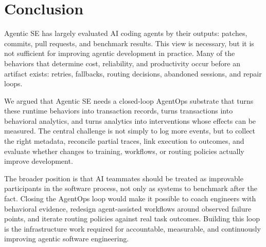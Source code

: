 \documentclass[sigconf,anonymous,review]{acmart}
\begin{document}
\section{Conclusion}
\label{sec:conclusion}


Agentic SE has largely evaluated AI coding agents by their outputs:
patches, commits, pull requests, and benchmark results. This view is
necessary, but it is not sufficient for improving agentic development
in practice. Many of the behaviors that determine cost, reliability,
and productivity occur before an artifact exists: retries, fallbacks,
routing decisions, abandoned sessions, and repair loops.

We argued that Agentic SE needs a closed-loop AgentOps substrate that
turns these runtime behaviors into transaction records, turns
transactions into behavioral analytics, and turns analytics into
interventions whose effects can be measured. The central challenge is
not simply to log more events, but to collect the right metadata,
reconcile partial traces, link execution to outcomes, and evaluate
whether changes to training, workflows, or routing policies actually
improve development.

The broader position is that AI teammates should be treated as
improvable participants in the software process, not only as systems
to benchmark after the fact. Closing the AgentOps loop would make it
possible to coach engineers with behavioral evidence, redesign
agent-assisted workflows around observed failure points, and iterate
routing policies against real task outcomes. Building this loop is the
infrastructure work required for accountable, measurable, and
continuously improving agentic software engineering.



\end{document}
